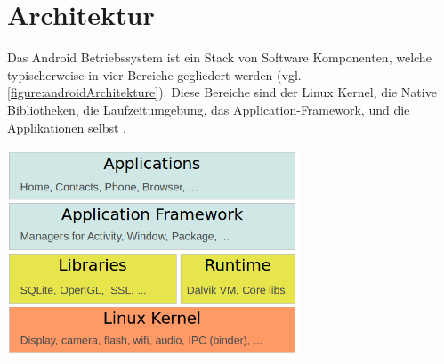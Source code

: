 \section{Architektur}
Das Android Betriebssystem ist ein Stack von Software Komponenten, welche typischerweise in vier Bereiche gegliedert werden (vgl. \ref{figure:androidArchitekture}). Diese Bereiche sind der Linux Kernel, die Native Bibliotheken, die Laufzeitumgebung, das Application-Framework, und die Applikationen selbst \cite{androidTutorialOS}. \\

\begin{minipage}{\textwidth} 
	\centering	
	\includegraphics[width=0.65\textwidth]{figures/android_stack.png}
	\label{figure:androidArchitekture}
	\vspace{2ex}
\end{minipage}

